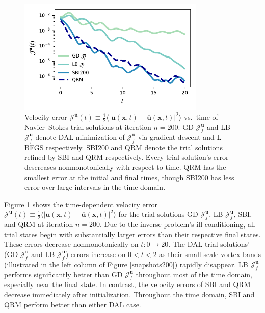 \documentclass[%
 reprint,
 amsmath,amssymb,
 aps,
 pre,
]{revtex4-2}
\renewcommand{\vec}[1]{\boldsymbol{#1}}
\newcommand{\J}{\mathcal{J}}
\newcommand{\Ju}{\mathcal{J}^{\vec{u}}}
\newcommand{\JUf}{\mathcal{J}^{\vec{u}}_f}
\begin{document}
\begin{figure}
  \centering
  \includegraphics[width=3.5in]{qdev.pdf}
  \caption{Velocity error $\Ju(t)\equiv\frac{1}{2}\big\langle |\vec{u}(\vec{x},t)-\vec{\overline{u}}(\vec{x},t)|^2\big\rangle$ vs.~time of Navier--Stokes trial solutions at iteration $n=200$. GD $\JUf$ and LB $\JUf$ denote DAL minimization of $\JUf$ via gradient descent and L-BFGS respectively. SBI200 and QRM denote the trial solutions refined by SBI and QRM respectively.
  Every trial solution's error descreases nonmonotonically with respect to time.
  QRM has the smallest error at the initial and final times, though SBI200 has less error over large intervals in the time domain.}
  \label{traces}
\end{figure}

Figure \ref{traces} shows the time-dependent velocity error $\J^{\vec{u}}(t)\equiv\frac{1}{2}\langle| \vec{u}(\vec{x},t) - \vec{\overline{u}}(\vec{x},t)|^2\rangle$ for the trial solutions GD $\JUf$, LB $\JUf$, SBI, and QRM at iteration $n=200$.
Due to the inverse-problem's ill-conditioning, all trial states begin with substantially larger errors than their respective final states.
These errors decrease nonmonotonically on $t:0\to 20$.
The DAL trial solutions' (GD $\JUf$ and LB $\JUf$) errors increase on $0<t<2$ as their small-scale vortex bands (illustrated in the left column of Figure \ref{snapshots200}) rapidly disappear. 
LB $\JUf$ performs significantly better than GD $\JUf$ throughout most of the time domain, especially near the final state.
In contrast, the velocity errors of SBI and QRM decrease immediately after initialization.
Throughout the time domain, SBI and QRM perform better than either DAL case.
\end{document}
